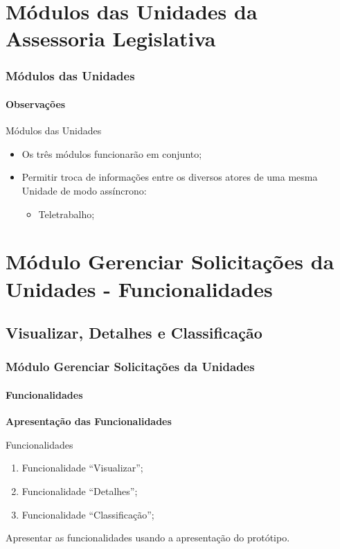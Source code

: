 
\section{Módulos das Unidades da Assessoria Legislativa}
\begin{frame}
	\frametitle{Módulos das Unidades}
	\framesubtitle{Observações}
	
	
	\begin{block}{Módulos das Unidades}
		\begin{itemize}
			\item Os três módulos funcionarão em conjunto;
			\item Permitir troca de informações entre os diversos atores de uma mesma Unidade de modo assíncrono:
			\begin{itemize}
				\item Teletrabalho;
			\end{itemize}
		\end{itemize}
	\end{block}	
\end{frame}


\section{Módulo Gerenciar Solicitações da Unidades - Funcionalidades}


\subsection{Visualizar, Detalhes e Classificação}

\begin{frame}
	\frametitle{Módulo Gerenciar Solicitações da Unidades}
	\framesubtitle{Funcionalidades}
	
	\textbf{Apresentação das Funcionalidades}
	
	\begin{alertblock}{Funcionalidades}
		\begin{enumerate}
			\item Funcionalidade ``Visualizar'';
			\item Funcionalidade ``Detalhes'';
			\item Funcionalidade ``Classificação'';
		\end{enumerate}
	\end{alertblock}	

	\begin{block}{} %
	\footnotesize Apresentar as funcionalidades usando a apresentação do protótipo. \normalsize
	\end{block}
	

\end{frame}



